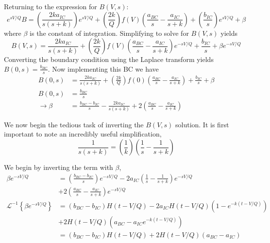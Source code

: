 \documentclass[a4paper,12pt]{article}
\begin{document}
\newpage
Returning to the expression for $B(V, s)$:
\begin{equation}
	e^{sV/Q}B = \left( \frac{2ka_{IC}}{s (s+k)} \right) e^{sV/Q} + 
				\left( \frac{2k}{Q} \right)f(V) \left( \frac{a_{BC}}{s} - \frac{a_{IC}}{s+k} \right) +
				\left( \frac{b_{IC}}{s}  \right) e^{sV/Q} + \beta
\end{equation}
where $\beta$ is the constant of integration. 
Simplifying to solve for $B(V, s)$ yields
\begin{equation}
	B(V, s) = \frac{2ka_{IC}}{s (s+k)} + 
		\left( \frac{2k}{Q} \right)f(V) \left( \frac{a_{BC}}{s} - \frac{a_{IC}}{s+k} \right) e^{-sV/Q} +
		\frac{b_{IC}}{s} + \beta e^{-sV/Q}
\end{equation}
Converting the boundary condition using the Laplace transform yields $ B(0, s) = \frac{b_{BC}}{s} $.
Now implementing this BC we have 
\begin{align}
	B(0, s) &= \frac{2ka_{IC}}{s (s+k)} + 
	\left( \frac{2k}{Q} \right)f(0) \left( \frac{a_{BC}}{s} - \frac{a_{IC}}{s+k} \right) +
	\frac{b_{IC}}{s} + \beta \\
	B(0, s) &= \frac{b_{BC}}{s} \\
	\rightarrow \beta &= \frac{b_{BC} - b_{IC}}{s} - \frac{2ka_{IC}}{s (s+k)} + 
	2 \left( \frac{a_{BC}}{s} - \frac{a_{IC}}{s+k} \right)
\end{align}

We now begin the tedious task of inverting the $B(V, s)$ solution.
It is first important to note an incredibly useful simplification,
\begin{equation}
	\frac{1}{s(s+k)} = \left(\frac{1}{k}\right) \left(\frac{1}{s} - \frac{1}{s+k}\right)
\end{equation}

We begin by inverting the term with $\beta$, 
\begin{align}
	\beta e^{-sV/Q}  &= \left( \frac{b_{BC} - b_{IC}}{s} \right) e^{-sV/Q} - 
						2a_{IC} \left(\frac{1}{s} - \frac{1}{s+k}\right) e^{-sV/Q}\\
						&+  2 \left( \frac{a_{BC}}{s} - \frac{a_{IC}}{s+k} \right) e^{-sV/Q}\\
	\mathscr{L}^{-1} \left\{ \beta e^{-sV/Q} \right\} &= (b_{BC}-b_{IC})H(t-V/Q) - 
					2a_{IC}H(t-V/Q)(1-e^{-k(t-V/Q)})\\
					&+ 2H(t-V/Q)(a_{BC} - a_{IC}e^{-k(t-V/Q)})\\
					&= (b_{BC}-b_{IC})H(t-V/Q) + 2H(t-V/Q) (a_{BC}-a_{IC})
\end{align}
\end{document}

